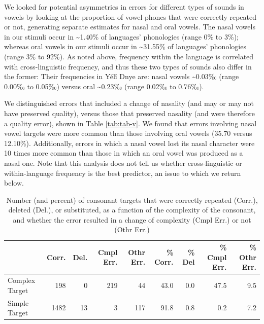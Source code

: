 \documentclass[
  american,
  ,man,floatsintext]{apa6}
\begin{document}
We looked for potential asymmetries in errors for different types of sounds in vowels by looking at the proportion of vowel phones that were correctly repeated or not, generating separate estimates for nasal and oral vowels. The nasal vowels in our stimuli occur in \textasciitilde1.40\% of languages' phonologies (range 0\% to 3\%);
whereas oral vowels in our stimuli occur in \textasciitilde31.55\% of languages' phonologies (range 3\% to 92\%).
As noted above, frequency within the language is correlated with cross-linguistic frequency, and thus these two types of sounds also differ in the former: Their frequencies in Yélî Dnye are: nasal vowels \textasciitilde0.03‰ (range 0.00‰ to 0.05‰) versus oral \textasciitilde0.23‰ (range 0.02‰ to 0.76‰).

We distinguished errors that included a change of nasality (and may or may not have preserved quality), versus those that preserved nasality (and were therefore a quality error), shown in Table \ref{tab:tab-v}. We found that errors involving nasal vowel targets were more common than those involving oral vowels (35.70 versus 12.10\%). Additionally, errors in which a nasal vowel lost its nasal character were 10 times more common than those in which an oral vowel was produced as a nasal one. Note that this analysis does not tell us whether cross-linguistic or within-language frequency is the best predictor, an issue to which we return below.

\begin{table}

\caption{\label{tab:tab-c}Number (and percent) of consonant targets that were correctly repeated (Corr.), deleted (Del.), or substituted, as a function of the complexity of the consonant, and whether the error resulted in a change of complexity (Cmpl Err.) or not (Othr Err.)}
\centering
\begin{tabular}[t]{lrrrrrrrr}
\toprule
  & Corr. & Del. & Cmpl Err. & Othr Err. & \% Corr. & \% Del & \% Cmpl Err. & \% Othr Err.\\
\midrule
Complex Target & 198 & 0 & 219 & 44 & 43.0 & 0.0 & 47.5 & 9.5\\
Simple Target & 1482 & 13 & 3 & 117 & 91.8 & 0.8 & 0.2 & 7.2\\
\bottomrule
\end{tabular}
\end{table}
\end{document}
